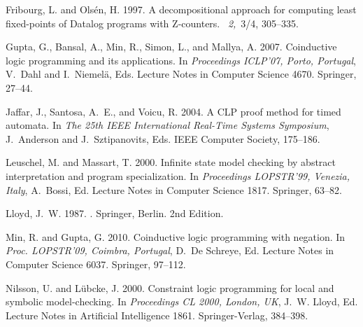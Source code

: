 \documentclass[english]{tlp}
\begin{document}
\begin{thebibliography}{}
{\sc Fribourg, L.} {\sc and} {\sc Ols\'en, H.} 1997.
\newblock A decompositional approach for computing least fixed-points of
  {D}atalog programs with {Z}-counters.
~{\em 2,\/}~3/4, 305--335.

{\sc Gupta, G.}, {\sc Bansal, A.}, {\sc Min, R.}, {\sc Simon, L.}, {\sc and}
  {\sc Mallya, A.} 2007.
\newblock Coinductive logic programming and its applications.
\newblock In {\em Proceedings ICLP'07, Porto, Portugal}, {V.~Dahl} {and}
  {I.~Niemel{\"a}}, Eds. Lecture Notes in Computer Science 4670. Springer,
  27--44.

{\sc Jaffar, J.}, {\sc Santosa, A.~E.}, {\sc and} {\sc Voicu, R.} 2004.
\newblock A {CLP} proof method for timed automata.
\newblock In {\em The 25th IEEE International Real-Time Systems Symposium},
  {J.~Anderson} {and} {J.~Sztipanovits}, Eds. IEEE Computer Society, 175--186.

{\sc Leuschel, M.} {\sc and} {\sc Massart, T.} 2000.
\newblock Infinite state model checking by abstract interpretation and program
  specialization.
\newblock In {\em Proceedings LOPSTR'99, Venezia, Italy},
  {A.~Bossi}, Ed. Lecture Notes in Computer Science 1817. Springer, 63--82.
  
{\sc Lloyd, J.~W.} 1987.
.
\newblock Springer, Berlin. 
\newblock 2nd Edition.

{\sc Min, R.} {\sc and} {\sc Gupta, G.} 2010.
\newblock Coinductive logic programming with negation.
\newblock In {\em Proc. LOPSTR'09,
  Coimbra, Portugal}, {D.~{De Schreye}}, Ed.  
  Lecture Notes in Computer Science 6037. Springer, 97--112.
  
  
{\sc Nilsson, U.} {\sc and} {\sc L{\"u}bcke, J.} 2000.
\newblock Constraint logic programming for local and symbolic model-checking.
\newblock In {\em Proceedings CL 2000, London, UK}, {J.~W. Lloyd}, Ed.
  Lecture Notes in Artificial Intelligence 1861. Springer-Verlag, 384--398.


\end{thebibliography}
\end{document}
